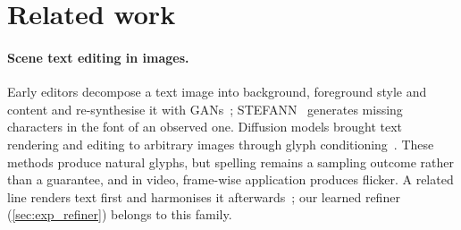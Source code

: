\section{Related work}
\label{sec:related}

\paragraph{Scene text editing in images.} Early editors decompose a text image into background, foreground style and content and re-synthesise it with GANs~\cite{wu2019srnet,roy2020stefann,krishnan2023textstylebrush,qu2023mostel}; STEFANN~\cite{roy2020stefann} generates missing characters in the font of an observed one. Diffusion models brought text rendering and editing to arbitrary images through glyph conditioning~\cite{chen2023textdiffuser,yang2023glyphcontrol,tuo2024anytext,tuo2024anytext2,ji2023diffste,zhao2024udifftext,liu2024glyphbyt5,zeng2024textctrl,glyphmastero2025}. These methods produce natural glyphs, but spelling remains a sampling outcome rather than a guarantee, and in video, frame-wise application produces flicker. A related line renders text first and harmonises it afterwards~\cite{zhan2019sfgan,glyphbanana2026}; our learned refiner (\cref{sec:exp_refiner}) belongs to this family.

